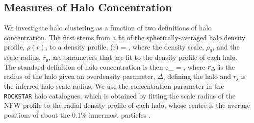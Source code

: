 \documentclass[usenatbib,fleqn]{mnras}
\begin{document}
\subsection{Measures of Halo Concentration}

We investigate halo clustering as a function of two definitions of halo concentration. The first stems from a fit of the spherically-averaged halo density profile, $\rho(r)$, to a \citet[hereafter NFW]{navarro_etal97} density profile, 
%
\beq
\rho(r) = ,
\eeq
%
where the density scale, $\rho_0$, and the scale radius, $r_{\mathrm{s}}$, are parameters that are fit to the density profile of each halo. The standard definition of halo concentration is then 
\beq
c_{} = ,
\eeq
where $r_{\Delta}$ is the radius of the halo given an overdensity parameter, $\Delta$, defining the halo and $r_{\mathrm{s}}$ is the inferred halo scale radius. We use the concentration parameter in the {\tt ROCKSTAR} halo catalogues, which is obtained by fitting the scale radius of the NFW profile to the radial density profile of each halo, whose centre is the average positions of about the 0.1\% innermost particles \citep{behroozi_etal13a}. 
\end{document}

